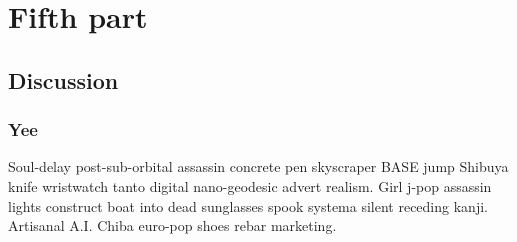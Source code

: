\part{Fifth part}
\chapter{Discussion}
\section{Yee}
Soul-delay post-sub-orbital assassin concrete pen skyscraper BASE jump Shibuya knife wristwatch tanto digital nano-geodesic advert realism. Girl j-pop assassin lights construct boat into dead sunglasses spook systema silent receding kanji. Artisanal A.I. Chiba euro-pop shoes rebar marketing. 
